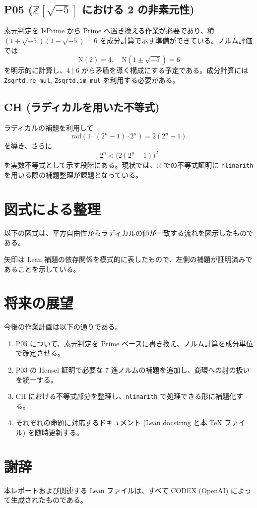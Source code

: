 \documentclass[12pt]{ltjsarticle}
\begin{document}
\subsection*{P05 (\(\mathbb{Z}[\sqrt{-5}]\) における 2 の非素元性)}
素元判定を \( \mathrm{IsPrime} \) から \( \mathrm{Prime} \) へ置き換える作業が必要であり、積 \( (1+\sqrt{-5})(1-\sqrt{-5}) = 6 \) を成分計算で示す準備ができている。ノルム評価では
\[
  \mathrm{N}(2) = 4,\quad \mathrm{N}(1\pm\sqrt{-5}) = 6
\]
を明示的に計算し、\(4\mid 6\) から矛盾を導く構成にする予定である。成分計算には \texttt{Zsqrtd.re\_mul}, \texttt{Zsqrtd.im\_mul} を利用する必要がある。

\subsection*{CH (ラディカルを用いた不等式)}
ラディカルの補題を利用して
\[
  \mathrm{rad}(1\cdot (2^n-1) \cdot 2^n) = 2(2^n-1)
\]
を導き、さらに
\[
  2^n < \bigl(2(2^n-1)\bigr)^2
\]
を実数不等式として示す段階にある。現状では、\( \mathbb{R} \) での不等式証明に \texttt{nlinarith} を用いる際の補題整理が課題となっている。

\section{図式による整理}
以下の図式は、平方自由性からラディカルの値が一致する流れを図示したものである。
\begin{center}
\end{center}
矢印は Lean 補題の依存関係を模式的に表したもので、左側の補題が証明済みであることを示している。

\section{将来の展望}
今後の作業計画は以下の通りである。
\begin{enumerate}[label=\textbf{Step\arabic*}., leftmargin=2.5em]
  \item P05 について、素元判定を \( \mathrm{Prime} \) ベースに書き換え、ノルム計算を成分単位で確定させる。
  \item P03 の Hensel 証明で必要な 7 進ノルムの補題を追加し、商環への射の扱いを統一する。
  \item CH における不等式部分を整理し、\texttt{nlinarith} で処理できる形に補題化する。
  \item それぞれの命題に対応するドキュメント (Lean docstring と本 TeX ファイル) を随時更新する。
\end{enumerate}

\section*{謝辞}
本レポートおよび関連する Lean ファイルは、すべて CODEX (OpenAI) によって生成されたものである。
\end{document}
